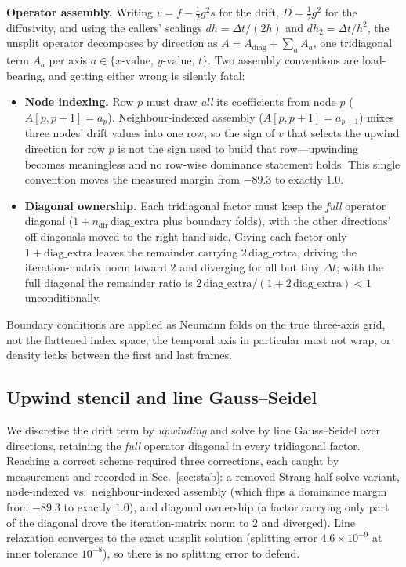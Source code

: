 \medskip\noindent\textbf{Operator assembly.} Writing $v=f-\tfrac12 g^2 s$ for the
drift, $D=\tfrac12 g^2$ for the diffusivity, and using the callers' scalings
$dh=\Delta t/(2h)$ and $dh_2=\Delta t/h^2$, the unsplit operator decomposes by
direction as $A = A_{\text{diag}} + \sum_{a} A_a$, one tridiagonal term $A_a$ per
axis $a\in\{x\text{-value},\,y\text{-value},\,t\}$. Two assembly conventions are
load-bearing, and getting either wrong is silently fatal:
\begin{itemize}
  \item \textbf{Node indexing.} Row $p$ must draw \emph{all} its coefficients from
        node $p$ ($A[p,p{+}1]=a_p$). Neighbour-indexed assembly
        ($A[p,p{+}1]=a_{p+1}$) mixes three nodes' drift values into one row, so the
        sign of $v$ that selects the upwind direction for row $p$ is not the sign
        used to build that row---upwinding becomes meaningless and no row-wise
        dominance statement holds. This single convention moves the measured
        margin from $-89.3$ to exactly $1.0$.
  \item \textbf{Diagonal ownership.} Each tridiagonal factor must keep the
        \emph{full} operator diagonal ($1+n_{\text{dir}}\,\text{diag\_extra}$ plus
        boundary folds), with the other directions' off-diagonals moved to the
        right-hand side. Giving each factor only $1+\text{diag\_extra}$ leaves the
        remainder carrying $2\,\text{diag\_extra}$, driving the iteration-matrix
        norm toward $2$ and diverging for all but tiny $\Delta t$; with the full
        diagonal the remainder ratio is
        $2\,\text{diag\_extra}/(1+2\,\text{diag\_extra})<1$ unconditionally.
\end{itemize}
Boundary conditions are applied as Neumann folds on the true three-axis grid, not
the flattened index space; the temporal axis in particular must not wrap, or
density leaks between the first and last frames.

\subsection{Upwind stencil and line Gauss--Seidel}
We discretise the drift term by \emph{upwinding} and solve by line
Gauss--Seidel over directions, retaining the \emph{full} operator diagonal in
every tridiagonal factor. Reaching a correct scheme required three corrections,
each caught by measurement and recorded in Sec.~\ref{sec:stab}: a removed Strang
half-solve variant, node-indexed vs.\ neighbour-indexed assembly (which flips a
dominance margin from $-89.3$ to exactly $1.0$), and diagonal ownership (a factor
carrying only part of the diagonal drove the iteration-matrix norm to $2$ and
diverged). Line relaxation converges to the exact unsplit solution
(splitting error $4.6\times10^{-9}$ at inner tolerance $10^{-8}$), so there is no
splitting error to defend.

